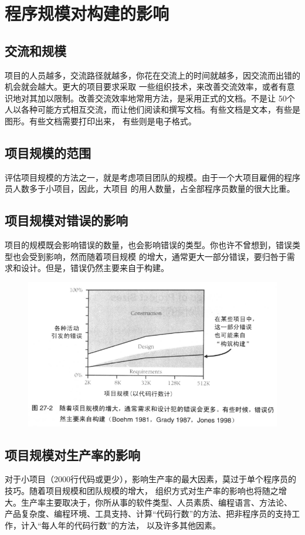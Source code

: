 \documentclass{article}
\begin{document}
\section{程序规模对构建的影响}
\subsection{交流和规模}
项目的人员越多，交流路径就越多，你花在交流上的时间就越多，因交流而出错的机会就会越大。更大的项目要求采取
一些组织技术，来改善交流效率，或者有意识地对其加以限制。改善交流效率地常用方法，是采用正式的文档。不是让
50个人以各种可能方式相互交流，而让他们阅读和撰写文档。有些文档是文本，有些是图形。有些文档需要打印出来，
有些则是电子格式。

\subsection{项目规模的范围}
评估项目规模的方法之一，就是考虑项目团队的规模。由于一个大项目雇佣的程序员人数多于小项目，因此，大项目
的用人数量，占全部程序员数量的很大比重。

\subsection{项目规模对错误的影响}
项目的规模既会影响错误的数量，也会影响错误的类型。你也许不曾想到，错误类型也会受到影响，然而随着项目规模
的增大，通常更大一部分错误，要归咎于需求和设计。但是，错误仍然主要来自于构建。
\begin{figure}[htb]
    \centering
    \includegraphics[width=15cm]{figure22.png}
\end{figure}

\subsection{项目规模对生产率的影响}
对于小项目（2000行代码或更少），影响生产率的最大因素，莫过于单个程序员的技巧。随着项目规模和团队规模的增大，
组织方式对生产率的影响也将随之增大。生产率主要取决于，你所从事的软件类型、人员素质、编程语言、方法论、
产品复杂度、编程环境、工具支持、计算“代码行数”的方法、把非程序员的支持工作，计入“每人年的代码行数”的方法，
以及许多其他因素。
\end{document}
